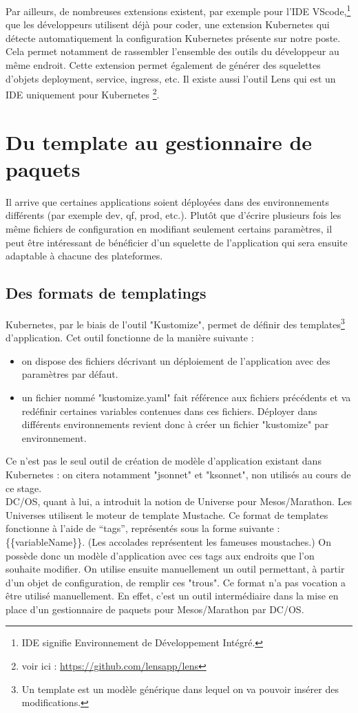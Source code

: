 \documentclass[11pt,fleqn]{book} %
\begin{document}
Par ailleurs, de nombreuses extensions existent, par exemple pour l'IDE VScode,\footnote{IDE signifie Environnement de Développement Intégré.} que les développeurs utilisent déjà pour coder, une extension Kubernetes qui détecte automatiquement la configuration Kubernetes présente sur notre poste. Cela permet notamment de rassembler l'ensemble des outils du développeur au même endroit. Cette extension permet également de générer des squelettes d'objets deployment, service, ingress, etc. Il existe aussi l'outil Lens qui est un IDE uniquement pour Kubernetes \footnote{voir ici : \url{https://github.com/lensapp/lens}}.

\section{Du template au gestionnaire de paquets}
Il arrive que certaines applications soient déployées dans des environnements différents (par exemple dev, qf, prod, etc.). Plutôt que d'écrire plusieurs fois les même fichiers de configuration en modifiant seulement certains paramètres, il peut être intéressant de bénéficier d'un squelette de l'application qui sera ensuite adaptable à chacune des plateformes.
\subsection{Des formats de templatings}
Kubernetes, par le biais de l'outil "Kustomize", permet de définir des templates\footnote{Un template est un modèle générique dans lequel on va pouvoir insérer des modifications.} d'application. Cet outil fonctionne de la manière suivante :
\begin{itemize}
    \item on dispose des fichiers décrivant un déploiement de l'application avec des paramètres par défaut.
    \item un fichier nommé "kustomize.yaml"  fait référence aux fichiers précédents et va redéfinir certaines variables contenues dans ces fichiers.
    Déployer dans différents environnements revient donc à créer un fichier "kustomize" par environnement.
\end{itemize}
Ce n'est pas le seul outil de création de modèle d'application existant dans Kubernetes : on citera notamment "jsonnet" et "ksonnet", non utilisés au cours de ce stage.\\ 

DC/OS, quant à lui, a introduit la notion de Universe pour Mesos/Marathon. Les Universes utilisent le moteur de template Mustache. 
Ce format de templates fonctionne à l’aide de “tags”, représentés sous la forme suivante : \{\{variableName\}\}. (Les accolades représentent les fameuses moustaches.) On possède donc un modèle d'application avec ces tags aux endroits que l'on souhaite modifier. On utilise ensuite manuellement un outil permettant, à partir d'un objet de configuration, de remplir ces "trous". Ce format n'a pas vocation a être utilisé manuellement. En effet, c'est un outil intermédiaire dans la mise en place d'un gestionnaire de paquets pour Mesos/Marathon par DC/OS.
\end{document}
